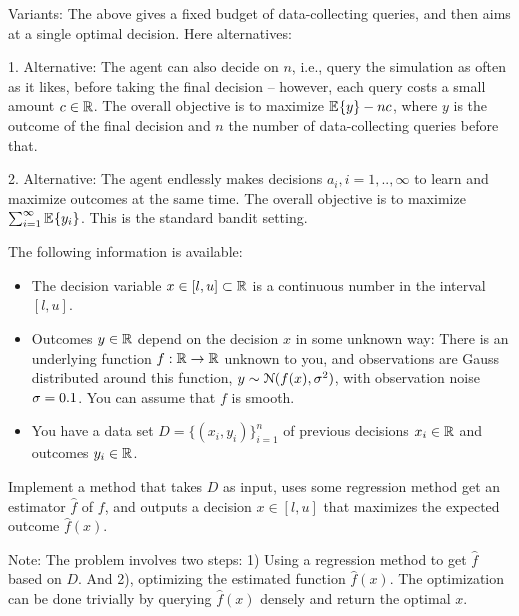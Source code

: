 Variants: The above gives a fixed budget of data-collecting queries, and then aims at a single optimal decision. Here alternatives:
\begin{items}
\item 1. Alternative: The agent can also decide on $n$, i.e., query the simulation as often as it likes, before taking the final decision -- however, each query costs a small amount $c\in{\mathbb{R}}$. The overall objective is to maximize $\mathbb{E}_{}\!\left\{y\right\} - nc$, where $y$ is the outcome of the final decision and $n$ the number of data-collecting queries before that.
\item 2. Alternative: The agent endlessly makes decisions $a_i, i=1,..,\infty$ to learn and maximize outcomes at the same time. The overall objective is to maximize $\sum_{i=1}^\infty \mathbb{E}_{}\!\left\{y_i\right\}$. This is the standard bandit setting.
\end{items}



The following information is available:
\begin{itemize}
\item The decision variable $x\in[l,u]\subset{\mathbb{R}}$ is a continuous number in the interval $[l,u]$.
\item Outcomes $y\in{\mathbb{R}}$ depend on the decision $x$ in some unknown way: There is an underlying function $f:{\mathbb{R}}\to{\mathbb{R}}$ unknown to you, and observations are Gauss distributed around this function, $y \sim {\cal N}(f(x), \sigma^2)$, with observation noise $\sigma=0.1$. You can assume that $f$ is smooth.
\item You have a data set $D=\{(x_i, y_i)\}_{i=1}^n$ of previous decisions $x_i\in{\mathbb{R}}$ and outcomes $y_i\in{\mathbb{R}}$.
\end{itemize}

Implement a method that takes $D$ as input, uses some regression method get an estimator $\hat f$ of $f$, and outputs a decision
$x\in[l,u]$ that maximizes the expected outcome $\hat f(x)$.

Note: The problem involves two steps: 1) Using a regression method to
get $\hat f$ based on $D$. And 2), optimizing the estimated function
$\hat f(x)$. The optimization can be done trivially by querying $\hat f(x)$ densely and
return the optimal $x$.

